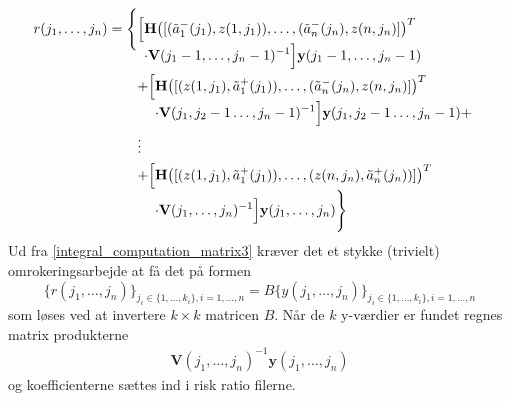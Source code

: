 \documentclass[a4paper, 12pt]{memoir}
\begin{document}
\begin{align}
r(j_1, \dots, j_n)&=\Biggl\{\begin{lgathered}[t]\Bigl[\begin{lgathered}[t] \mathbf{H}\bigl([(\tilde a_1^-(j_1), z(1,j_1)), \dots, (\tilde a_n^-(j_n), z(n,j_n)]\bigr)^T\\
\cdot \mathbf{V}(j_1-1, \dots, j_n-1)^{-1} \Bigr] \mathbf{y}(j_1-1, \dots, j_n-1) \end{lgathered}\\
+
\Bigl[\begin{lgathered}[t] \mathbf{H}\bigl([(z(1,j_1), \tilde a_1^+(j_1)), \dots, (\tilde a_n^-(j_n), z(n,j_n)]\bigr)^T\\
\cdot \mathbf{V}(j_1,j_2-1 \dots, j_n-1)^{-1} \Bigr] \mathbf{y}(j_1,j_2-1 \dots, j_n-1)+ \end{lgathered} \\
\vdots\\
+\Bigl[\begin{lgathered}[t] \mathbf{H}\bigl([( z(1,j_1), \tilde a_1^+(j_1)), \dots, (z(n,j_n), \tilde a_n^+(j_n))]\bigr)^T\\
\cdot \mathbf{V}(j_1, \dots, j_n)^{-1} \Bigr] \mathbf{y}(j_1, \dots, j_n) \Biggr\}\end{lgathered}\\
\end{lgathered}\label{integral_computation_matrix3}
\end{align}
Ud fra \eqref{integral_computation_matrix3} kræver det et stykke (trivielt) omrokeringsarbejde at få det på formen
\begin{equation}
\bigl\{r(j_1, \dots, j_n)\bigr\}_{j_i\in\{1, \dots, k_i\}, i=1, \dots, n}=B\bigl\{y(j_1, \dots, j_n)\bigr\}_{j_i\in\{1, \dots, k_i\}, i=1, \dots, n}
\end{equation}
som løses ved at invertere $k\times k$ matricen $B$. Når de $k$ y-værdier er fundet regnes matrix produkterne
\begin{align}
\mathbf{V}(j_1, \dots, j_n)^{-1} \mathbf{y}(j_1, \dots, j_n)
\end{align}
og koefficienterne sættes ind i risk ratio filerne.
\end{document}

